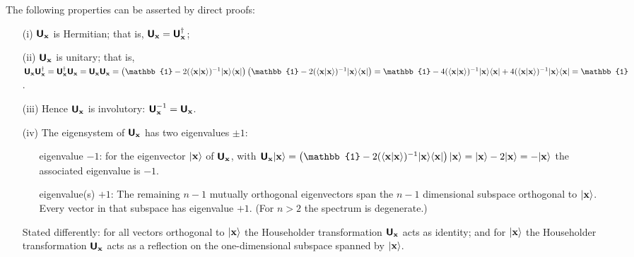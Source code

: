 The following properties can be asserted by direct proofs:
\begin{itemize}
\item[(i)]
$\textsf{\textbf{U}}_{\bf x}$ is Hermitian; that is,
$
\textsf{\textbf{U}}_{\bf x} = \textsf{\textbf{U}}_{\bf x}^\dagger
$;

\item[(ii)]
$\textsf{\textbf{U}}_{\bf x}$ is unitary; that is,
$
\textsf{\textbf{U}}_{\bf x}  \textsf{\textbf{U}}_{\bf x}^\dagger
=
\textsf{\textbf{U}}_{\bf x}^\dagger  \textsf{\textbf{U}}_{\bf x}
=
\textsf{\textbf{U}}_{\bf x}  \textsf{\textbf{U}}_{\bf x}
=
\left(\mathbb{1}- 2 ( \langle {\bf x} \vert   {\bf x} \rangle )^{-1} \vert {\bf x} \rangle \langle  {\bf x}  \vert\right)
\left(\mathbb{1}- 2 ( \langle {\bf x} \vert   {\bf x} \rangle )^{-1} \vert {\bf x} \rangle \langle  {\bf x}  \vert\right)
= \mathbb{1} - 4 ( \langle {\bf x} \vert   {\bf x} \rangle )^{-1} \vert {\bf x} \rangle \langle  {\bf x}  \vert
+ 4 ( \langle {\bf x} \vert   {\bf x} \rangle )^{-1} \vert {\bf x} \rangle \langle  {\bf x}  \vert =
\mathbb{1}
$.

\item[(iii)]
Hence $\textsf{\textbf{U}}_{\bf x}$ is involutory:
$\textsf{\textbf{U}}_{\bf x}^{-1} =  \textsf{\textbf{U}}_{\bf x}$.

\item[(iv)]
The eigensystem of $\textsf{\textbf{U}}_{\bf x}$ has two eigenvalues $\pm 1$:
\begin{itemize}
\item[eigenvalue $-1$:]
for the eigenvector $ \vert {\bf x} \rangle$ of    $\textsf{\textbf{U}}_{\bf x}$,
with
$\textsf{\textbf{U}}_{\bf x}\vert {\bf x} \rangle
=
\left(\mathbb{1}- 2 ( \langle {\bf x} \vert   {\bf x} \rangle )^{-1} \vert {\bf x} \rangle \langle  {\bf x}  \vert\right)\vert {\bf x} \rangle
= \vert {\bf x} \rangle- 2 \vert {\bf x} \rangle =- \vert {\bf x} \rangle$
the associated eigenvalue is $-1$.
\item[eigenvalue(s) $+1$:]
The remaining $n-1$ mutually orthogonal eigenvectors span the $n-1$ dimensional subspace orthogonal to $\vert {\bf x} \rangle $.
Every vector in that subspace has eigenvalue $+1$.
(For $n>2$ the spectrum is degenerate.)
\end{itemize}

Stated differently: for all vectors orthogonal to $\vert {\bf x} \rangle $ the
Householder transformation $\textsf{\textbf{U}}_{\bf x}$ acts as identity;
and for $\vert {\bf x} \rangle $ the
Householder transformation $\textsf{\textbf{U}}_{\bf x}$
acts as a reflection on the one-dimensional subspace spanned by $\vert {\bf x} \rangle $.


\end{itemize}
